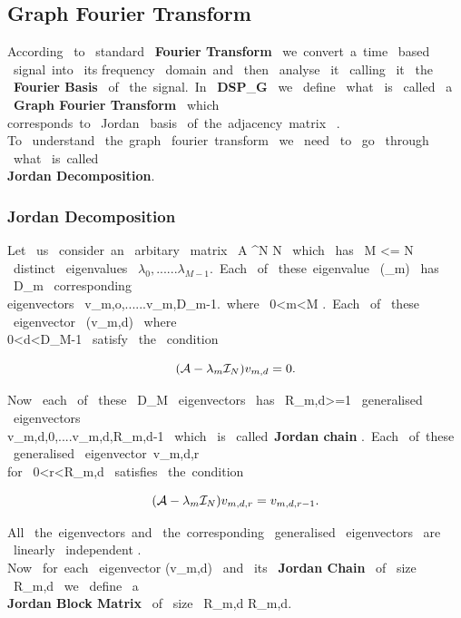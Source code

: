 \documentclass[12pt,onecolumn]{article}
\begin{document}
\subsection{{\textbf{Graph Fourier Transform}}}
According \ to \ standard \ \textbf{Fourier Transform} \ we\ convert\ a\ time \ based \ signal\ into \ its frequency \ domain\ and \ then \ analyse \ it  \ calling \ it \ the \ \textbf{Fourier Basis} \ of \ the\ signal.\ In \ {{\textbf{DSP}}_{\bf{G}}} \ we \ define \ what \ is \ called \ a \ \textbf{Graph Fourier Transform} \ which \\ corresponds\ to \ Jordan \ basis \ of\ the\ adjacency\ matrix \ . \\ To \ understand \ the\ graph \ fourier\ transform \ we \ need \ to  \ go \ through \ what \  is\ called \\ \textbf{Jordan Decomposition}. \\  
\subsubsection{\textbf{Jordan Decomposition}}
Let \ us \ consider\ an \ arbitary \ matrix \ A \in {}^{N \times N} \ which \ has \ M <= N \ distinct \ eigenvalues \ $ \lambda_{0},......\lambda_{M-1}.$\ Each \ of \ these\ eigenvalue \ (\lambda_{m}) \ has \ D_{m} \ corresponding \\ eigenvectors \ v_{m,o},......v_{m,D_{m}-1}.\ where \ 0<m<M .\ Each \ of \ these \ eigenvector \ (v_{m,d}) \ where \\ 0<d<D_{M}-1 \ satisfy \ the \ condition 

\begin{equation*}
    (\mathcal{A} - \lambda_{m}\mathcal{I}_{N})v_{m,d} = 0. \\ 
\end{equation*}

Now \ each \ of \ these \ D_{M} \ eigenvectors \ has \ R_{m,d}>=1  \ generalised  \ eigenvectors \\ v_{m,d,0},....v_{m,d,R_{m,d}-1} \ which \ is \ called\ \textbf{Jordan chain} .\ Each \ of\ these \ generalised \ eigenvector\ v_{m,d,r} \\ for \ 0<r<R_{m,d} \ satisfies \ the\ condition \ 

\begin{equation*}
    (\mathcal{A} - \lambda_{m}\mathcal{I}_{N})v_{m,d,r} = v_{m,d,r-1}. \\ 
\end{equation*}

All \ the\ eigenvectors\ and \ the\ corresponding \ generalised \ eigenvectors \ are \ linearly \ independent . \\
Now \ for\ each \ eigenvector (v_{m,d}) \ and \ its \ \textbf{Jordan Chain} \ of \ size \ R_{m,d} \ we \ define \ a \\ \textbf{Jordan Block Matrix} \ of \ size \   R_{m,d} \times R_{m,d}. \\
\end{document}
